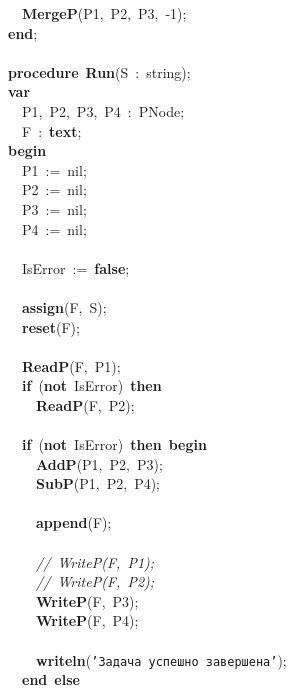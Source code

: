 \mbox{}\ \ \textbf{MergeP}(P1,\ P2,\ P3,\ -1); \\
\mbox{}\textbf{end}; \\
\mbox{} \\
\mbox{}\textbf{procedure}\ \textbf{Run}(S\ :\ string); \\
\mbox{}\textbf{var} \\
\mbox{}\ \ P1,\ P2,\ P3,\ P4\ :\ PNode; \\
\mbox{}\ \ F\ :\ \textbf{text}; \\
\mbox{}\textbf{begin} \\
\mbox{}\ \ P1\ :=\ nil; \\
\mbox{}\ \ P2\ :=\ nil; \\
\mbox{}\ \ P3\ :=\ nil; \\
\mbox{}\ \ P4\ :=\ nil; \\
\mbox{} \\
\mbox{}\ \ IsError\ :=\ \textbf{false}; \\
\mbox{} \\
\mbox{}\ \ \textbf{assign}(F,\ S); \\
\mbox{}\ \ \textbf{reset}(F); \\
\mbox{} \\
\mbox{}\ \ \textbf{ReadP}(F,\ P1); \\
\mbox{}\ \ \textbf{if}\ (\textbf{not}\ IsError)\ \textbf{then} \\
\mbox{}\ \ \ \ \textbf{ReadP}(F,\ P2); \\
\mbox{} \\
\mbox{}\ \ \textbf{if}\ (\textbf{not}\ IsError)\ \textbf{then}\ \textbf{begin} \\
\mbox{}\ \ \ \ \textbf{AddP}(P1,\ P2,\ P3); \\
\mbox{}\ \ \ \ \textbf{SubP}(P1,\ P2,\ P4); \\
\mbox{} \\
\mbox{}\ \ \ \ \textbf{append}(F); \\
\mbox{} \\
\mbox{}\ \ \ \ \textit{//\ WriteP(F,\ P1);} \\
\mbox{}\ \ \ \ \textit{//\ WriteP(F,\ P2);} \\
\mbox{}\ \ \ \ \textbf{WriteP}(F,\ P3); \\
\mbox{}\ \ \ \ \textbf{WriteP}(F,\ P4); \\
\mbox{} \\
\mbox{}\ \ \ \ \textbf{writeln}(\texttt{'Задача\ успешно\ завершена'}); \\
\mbox{}\ \ \textbf{end}\ \textbf{else} \\
